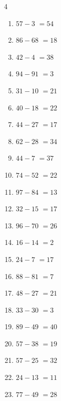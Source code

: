 \begin{multicols}{4}
\begin{enumerate}
  \item $57-3$
        $=54$

  \item $86-68$
        $=18$

  \item $42-4$
        $=38$

  \item $94-91$
        $=3$

  \item $31-10$
        $=21$

  \item $40-18$
        $=22$

  \item $44-27$
        $=17$

  \item $62-28$
        $=34$

  \item $44-7$
        $=37$

  \item $74-52$
        $=22$

  \item $97-84$
        $=13$

  \item $32-15$
        $=17$

\columnbreak %

  \item $96-70$
        $=26$

  \item $16-14$
        $=2$

  \item $24-7$
        $=17$

  \item $88-81$
        $=7$

  \item $48-27$
        $=21$

  \item $33-30$
        $=3$

  \item $89-49$
        $=40$

  \item $57-38$
        $=19$

  \item $57-25$
        $=32$

  \item $24-13$
        $=11$

  \item $77-49$
        $=28$


\end{enumerate}
\end{multicols}
